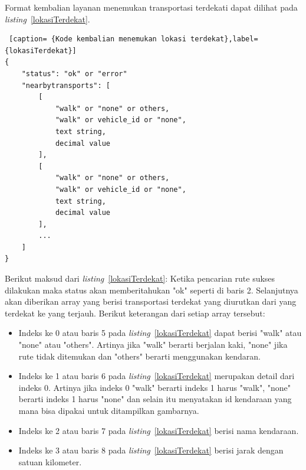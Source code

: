 Format kembalian layanan menemukan transportasi terdekati dapat dilihat pada \textit{listing}~\ref{lokasiTerdekat}.

\begin{lstlisting} [caption= {Kode kembalian menemukan lokasi terdekat},label={lokasiTerdekat}]
{
    "status": "ok" or "error"
    "nearbytransports": [
        [
            "walk" or "none" or others,
            "walk" or vehicle_id or "none",
            text string,
            decimal value
        ],
        [
            "walk" or "none" or others,
            "walk" or vehicle_id or "none",
            text string,
            decimal value
        ],
        ...     
    ]
}\end{lstlisting}
Berikut maksud dari \textit{listing}~\ref{lokasiTerdekat}: \newline
\hspace{0.5cm} Ketika pencarian rute sukses dilakukan maka status akan memberitahukan "ok" seperti di baris 2. Selanjutnya akan diberikan array yang berisi transportasi terdekat yang diurutkan dari yang terdekat ke yang terjauh. Berikut keterangan dari setiap array tersebut: 
\begin{itemize}
	\item Indeks ke 0 atau baris 5 pada \textit{listing}~\ref{lokasiTerdekat} dapat berisi "walk" atau "none" atau "others". Artinya  jika "walk" berarti berjalan kaki, "none" jika rute tidak ditemukan dan "others" berarti menggunakan kendaran.
	\item Indeks ke 1 atau baris 6 pada \textit{listing}~\ref{lokasiTerdekat} merupakan detail dari indeks 0. Artinya jika indeks 0 "walk" berarti indeks 1 harus "walk", "none" berarti indeks 1 harus "none" dan selain itu menyatakan id kendaraan yang mana bisa dipakai untuk ditampilkan gambarnya.
	\item Indeks ke 2 atau baris 7 pada \textit{listing}~\ref{lokasiTerdekat} berisi nama kendaraan.
	\item Indeks ke 3 atau baris 8 pada \textit{listing}~\ref{lokasiTerdekat} berisi jarak dengan satuan kilometer.
\end{itemize}